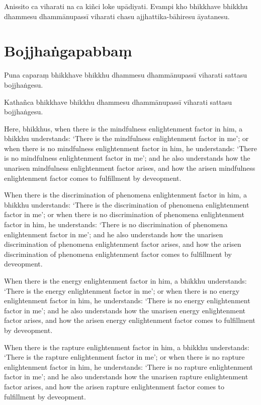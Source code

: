 Anissito ca viharati na ca kiñci loke upādiyati. Evampi kho bhikkhave bhikkhu
dhammesu dhammānupassī viharati chasu ajjhattika-bāhiresu āyatanesu.


\section*{Bojjhaṅgapabbaṃ}

Puna caparaṃ bhikkhave bhikkhu dhammesu dhammānupassī viharati sattasu
bojjhaṅgesu.

Kathañca bhikkhave bhikkhu dhammesu dhammānupassī viharati sattasu bojjhaṅgesu.

\englishPage

Here, bhikkhus, when there is the mindfulness enlightenment factor in him, a
bhikkhu understands: `There is the mindfulness enlightenment factor in me'; or
when there is no mindfulness enlightenment factor in him, he understands: `There
is no mindfulness enlightenment factor in me'; and he also understands how the
unarisen mindfulness enlightenment factor arises, and how the arisen mindfulness
enlightenment factor comes to fulfillment by deveopment.

When there is the discrimination of phenomena enlightenment factor in him, a
bhikkhu understands: `There is the discrimination of phenomena enlightenment
factor in me'; or when there is no discrimination of phenomena enlightenment
factor in him, he understands: `There is no discrimination of phenomena
enlightenment factor in me'; and he also understands how the unarisen
discrimination of phenomena enlightenment factor arises, and how the arisen
discrimination of phenomena enlightenment factor comes to fulfillment by
deveopment.

When there is the energy enlightenment factor in him, a bhikkhu understands:
`There is the energy enlightenment factor in me'; or when there is no energy
enlightenment factor in him, he understands: `There is no energy enlightenment
factor in me'; and he also understands how the unarisen energy enlightenment
factor arises, and how the arisen energy enlightenment factor comes to
fulfillment by deveopment.

When there is the rapture enlightenment factor in him, a bhikkhu understands:
`There is the rapture enlightenment factor in me'; or when there is no rapture
enlightenment factor in him, he understands: `There is no rapture enlightenment
factor in me'; and he also understands how the unarisen rapture enlightenment
factor arises, and how the arisen rapture enlightenment factor comes to
fulfillment by deveopment.

